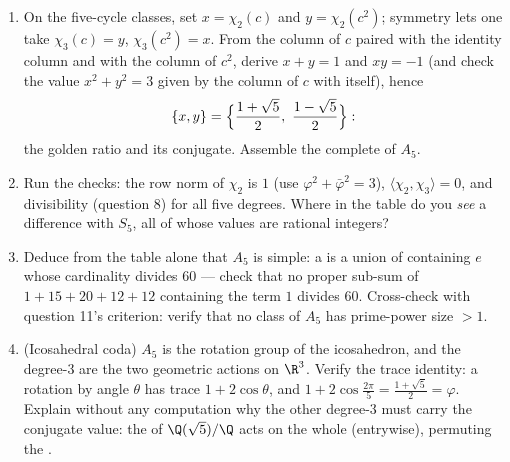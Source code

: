 \begin{problem}
\begin{enumerate}[resume]
        itself) determines their values off the five-cycles:
        show $\chi_2(g) = \chi_3(g) = -1$ on double
        transpositions and $0$ on three-cycles.
  \item On the five-cycle classes, set $x = \chi_2(c)$ and $y =
        \chi_2(c^2)$; symmetry lets one take $\chi_3(c) = y$,
        $\chi_3(c^2) = x$. From the column of $c$ paired with
        the identity column and with the column of $c^2$, derive
        $x + y = 1$ and $xy = -1$ (and check the value $x^2 +
        y^2 = 3$ given by the column of $c$ with itself), hence
        \[
        \{x, y\} = \Bigl\{\frac{1 + \sqrt5}2,\ \frac{1 -
        \sqrt5}2\Bigr\} :
        \]
        the golden ratio and its conjugate. Assemble the
        complete  of $A_5$.
  \item Run the checks: the row norm of $\chi_2$ is $1$ (use
        $\varphi^2 + \bar\varphi^2 = 3$), $\langle\chi_2,
        \chi_3\rangle = 0$, and  divisibility (question
        8) for all five degrees. Where in the table do you
        \emph{see} a difference with $S_5$, all of whose
         values are rational integers?
  \item Deduce from the table alone that $A_5$ is simple: a
         is a union of 
        containing $e$ whose cardinality divides $60$ --- check
        that no proper sub-sum of $1 + 15 + 20 + 12 + 12$
        containing the term $1$ divides $60$. Cross-check with
        question 11's criterion: verify that no class of $A_5$
        has prime-power size $> 1$.
  \item (Icosahedral coda) $A_5$ is the rotation group of the
        icosahedron, and the degree-$3$  are the
        two geometric actions on $\R^3$. Verify the trace
        identity: a rotation by angle $\theta$ has trace $1 +
        2\cos\theta$, and $1 + 2\cos\frac{2\pi}5 =
        \frac{1+\sqrt5}2 = \varphi$. Explain without any
        computation why the other degree-$3$  must
        carry the conjugate value: the  of
        $\Q(\sqrt5)/\Q$ acts on the whole 
        (entrywise), permuting the  .
\end{enumerate}


\end{problem}
